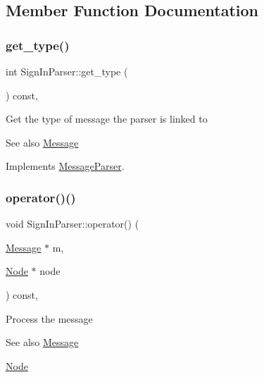 \subsection{Member Function Documentation}
\mbox{\label{classSignInParser_a30af4fa4b99e704e48848aab284d6a24}} 
\subsubsection{\texorpdfstring{get\+\_\+type()}{get\_type()}}
{\footnotesize\ttfamily int Sign\+In\+Parser\+::get\+\_\+type (\begin{DoxyParamCaption}{ }\end{DoxyParamCaption}) const\hspace{0.3cm}{\ttfamily [final]}, {\ttfamily [virtual]}}

Get the type of message the parser is linked to \begin{DoxySeeAlso}{See also}
\mbox{\hyperlink{classMessage}{Message}} 
\end{DoxySeeAlso}


Implements \mbox{\hyperlink{classMessageParser_aa7c495d7b28a394e5752ca25ffff69d8}{Message\+Parser}}.

\mbox{\label{classSignInParser_aa73b5113c2c03361469149c456ef9cc0}} 
\subsubsection{\texorpdfstring{operator()()}{operator()()}}
{\footnotesize\ttfamily void Sign\+In\+Parser\+::operator() (\begin{DoxyParamCaption}\item[{\mbox{\hyperlink{classMessage}{Message}} $\ast$}]{m,  }\item[{\mbox{\hyperlink{classNode}{Node}} $\ast$}]{node }\end{DoxyParamCaption}) const\hspace{0.3cm}{\ttfamily [final]}, {\ttfamily [virtual]}}

Process the message \begin{DoxySeeAlso}{See also}
\mbox{\hyperlink{classMessage}{Message}} 

\mbox{\hyperlink{classNode}{Node}}
\end{DoxySeeAlso}

